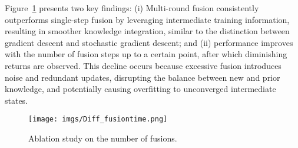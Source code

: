 
Figure~\ref{fig:fusion} presents two key findings: (i) Multi-round fusion consistently outperforms single-step fusion by leveraging intermediate training information, resulting in smoother knowledge integration, similar to the distinction between gradient descent and stochastic gradient descent; and (ii) performance improves with the number of fusion steps up to a certain point, after which diminishing returns are observed.
This decline occurs because excessive fusion introduces noise and redundant updates, disrupting the balance between new and prior knowledge, and potentially causing overfitting to unconverged intermediate states. 



\begin{figure}[t]
  \centering
  \texttt{[image: imgs/Diff\_fusiontime.png]}
  \caption{Ablation study on the number of fusions.}
  \label{fig:fusion}
\end{figure}








